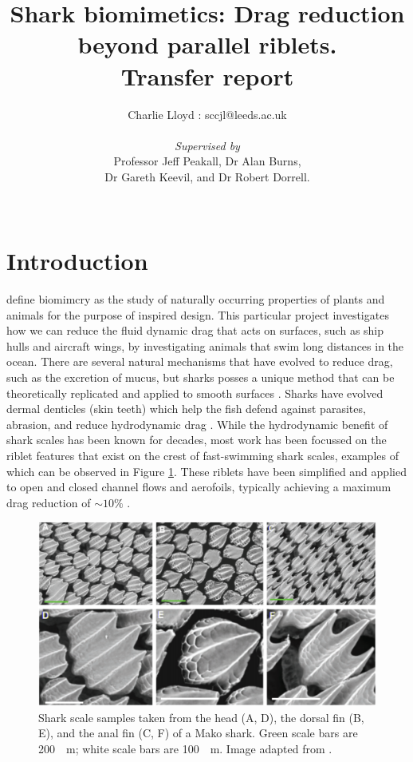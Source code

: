 \documentclass[12pt,oneside,a4paper]{article}
\title{Shark biomimetics: Drag reduction beyond parallel riblets.
\\
 Transfer report
}
\author{Charlie Lloyd : sccjl@leeds.ac.uk
\\\\
\textit{Supervised by}
\\
Professor Jeff Peakall, Dr Alan Burns,
\\
Dr Gareth Keevil, and Dr Robert Dorrell.
\\\\}
\begin{document}
\maketitle



\newpage

\tableofcontents

\newpage
{}
\section{Introduction}
\cite{dean2010} define biomimcry as the study of naturally occurring properties of plants and animals for the purpose of inspired design. This particular project investigates how we can reduce the fluid dynamic drag that acts on surfaces, such as ship hulls and aircraft wings, by investigating animals that swim long distances in the ocean. There are several natural mechanisms that have evolved to reduce drag, such as the excretion of mucus, but sharks posses a unique method that can be theoretically replicated and applied to smooth surfaces \citep{dean2010}. Sharks have evolved dermal denticles (skin teeth) which help the fish defend against parasites, abrasion, and reduce hydrodynamic drag \citep{fletcher2014}. While the hydrodynamic benefit of shark scales has been known for decades, most work has been focussed on the riblet features that exist on the crest of fast-swimming shark scales, examples of which can be observed in Figure \ref{figure:scalesExample}. These riblets have been simplified and applied to open and closed channel flows and aerofoils, typically achieving a maximum drag reduction of $\sim 10\%$ \citep{dean2010}.
\begin{figure}[!b]
\centering
\includegraphics[width=12cm]{images/Scales2.png}
\caption{Shark scale samples taken from the head (A, D), the dorsal fin (B, E), and the anal fin (C, F) of a Mako shark. Green scale bars are \SI{200}{\mu m}; white scale bars are \SI{100}{\mu m}. Image adapted from \cite{wen2014}.}
\label{figure:scalesExample}
\end{figure}
\end{document}
